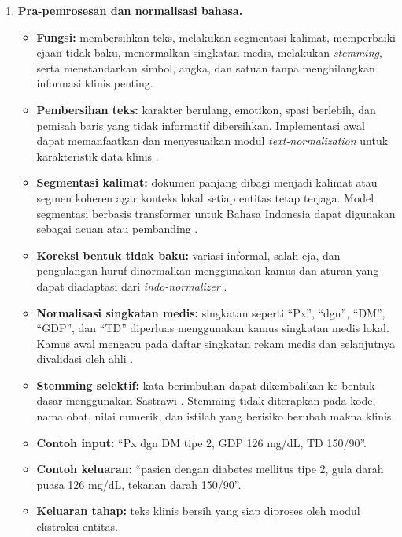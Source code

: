 \begin{enumerate}
    \item \textbf{Pra-pemrosesan dan normalisasi bahasa.}
    \begin{itemize}
        \item \textbf{Fungsi:} membersihkan teks, melakukan segmentasi kalimat, memperbaiki ejaan tidak baku, menormalkan singkatan medis, melakukan \textit{stemming}, serta menstandarkan simbol, angka, dan satuan tanpa menghilangkan informasi klinis penting.
        \item \textbf{Pembersihan teks:} karakter berulang, emotikon, spasi berlebih, dan pemisah baris yang tidak informatif dibersihkan. Implementasi awal dapat memanfaatkan dan menyesuaikan modul \textit{text-normalization} untuk karakteristik data klinis \citep{utomo_text_normalization}.
        \item \textbf{Segmentasi kalimat:} dokumen panjang dibagi menjadi kalimat atau segmen koheren agar konteks lokal setiap entitas tetap terjaga. Model segmentasi berbasis transformer untuk Bahasa Indonesia dapat digunakan sebagai acuan atau pembanding \citep{Hananto2026}.
        \item \textbf{Koreksi bentuk tidak baku:} variasi informal, salah eja, dan pengulangan huruf dinormalkan menggunakan kamus dan aturan yang dapat diadaptasi dari \textit{indo-normalizer} \citep{dyasputro_indo_normalizer}.
        \item \textbf{Normalisasi singkatan medis:} singkatan seperti ``Px'', ``dgn'', ``DM'', ``GDP'', dan ``TD'' diperluas menggunakan kamus singkatan medis lokal. Kamus awal mengacu pada daftar singkatan rekam medis dan selanjutnya divalidasi oleh ahli \citep{RSI_Sultan_Agung_2019}.
        \item \textbf{Stemming selektif:} kata berimbuhan dapat dikembalikan ke bentuk dasar menggunakan Sastrawi \citep{librian_sastrawi}. Stemming tidak diterapkan pada kode, nama obat, nilai numerik, dan istilah yang berisiko berubah makna klinis.
        \item \textbf{Contoh input:} ``Px dgn DM tipe 2, GDP 126 mg/dL, TD 150/90''.
        \item \textbf{Contoh keluaran:} ``pasien dengan diabetes mellitus tipe 2, gula darah puasa 126 mg/dL, tekanan darah 150/90''.
        \item \textbf{Keluaran tahap:} teks klinis bersih yang siap diproses oleh modul ekstraksi entitas.
    \end{itemize}


\end{enumerate}
